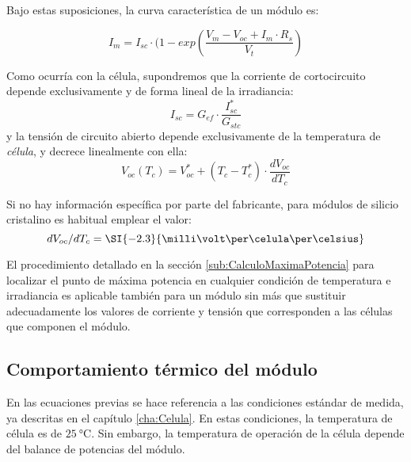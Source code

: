 Bajo estas suposiciones, la curva característica de un módulo es:

\begin{equation}
I_{m}=I_{sc}\cdot(1-exp(\frac{V_{m}-V_{oc}+I_{m}\cdot R_{s}}{V_{t}})\end{equation}


Como ocurría con la célula, supondremos que la corriente de cortocircuito
depende exclusivamente y de forma lineal de la irradiancia:\begin{equation}
I_{sc}=G_{ef}\cdot\frac{I_{sc}^{*}}{G_{stc}}\end{equation}
y la tensión de circuito abierto depende exclusivamente de la temperatura
de \emph{célula}, y decrece linealmente con ella:
\begin{equation}
V_{oc}(T_{c})=V_{oc}^{*}+(T_{c}-T_{c}^{*})\cdot\frac{dV_{oc}}{dT_{c}}
\end{equation}

Si no hay información específica por parte del fabricante, para módulos de silicio cristalino es habitual emplear el valor:
\begin{equation}
dV_{oc}/dT_{c} = \SI{-2.3}{\milli\volt\per\celula\per\celsius}
\end{equation}

El procedimiento detallado en la sección \ref{sub:CalculoMaximaPotencia}
para localizar el punto de máxima potencia en cualquier condición
de temperatura e irradiancia es aplicable también para un módulo sin
más que sustituir adecuadamente los valores de corriente y tensión
que corresponden a las células que componen el módulo.


\subsection{Comportamiento térmico del módulo}
\label{sec:tonc}
En las ecuaciones previas se hace referencia a las condiciones estándar
de medida, ya descritas en el capítulo \ref{cha:Celula}. En estas
condiciones, la temperatura de célula es de $\SI{25}{\celsius}$.
Sin embargo, la temperatura de operación de la célula depende del
balance de potencias del módulo. 

